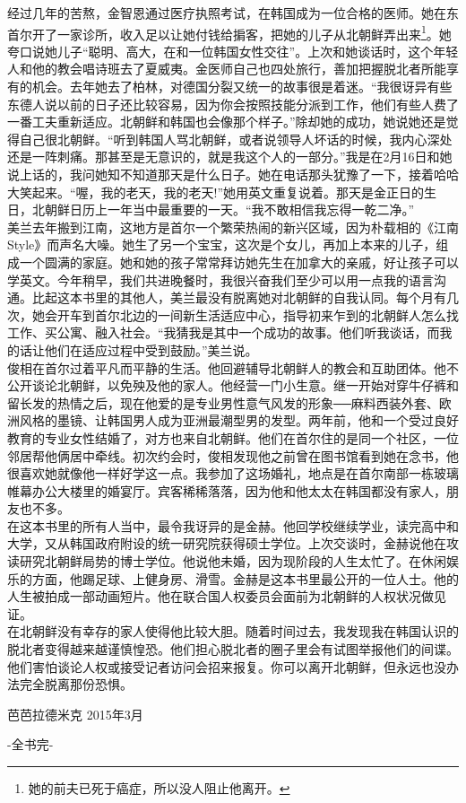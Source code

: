 经过几年的苦熬，金智恩通过医疗执照考试，在韩国成为一位合格的医师。她在东首尔开了一家诊所，收入足以让她付钱给掮客，把她的儿子从北朝鲜弄出来\footnote{她的前夫已死于癌症，所以没人阻止他离开。}。她夸口说她儿子“聪明、高大，在和一位韩国女性交往”。上次和她谈话时，这个年轻人和他的教会唱诗班去了夏威夷。金医师自己也四处旅行，善加把握脱北者所能享有的机会。去年她去了柏林，对德国分裂又统一的故事很是着迷。“我很讶异有些东德人说以前的日子还比较容易，因为你会按照技能分派到工作，他们有些人费了一番工夫重新适应。北朝鲜和韩国也会像那个样子。”除却她的成功，她说她还是觉得自己很北朝鲜。“听到韩国人骂北朝鲜，或者说领导人坏话的时候，我内心深处还是一阵刺痛。那甚至是无意识的，就是我这个人的一部分。”我是在2月16日和她说上话的，我问她知不知道那天是什么日子。她在电话那头犹豫了一下，接着哈哈大笑起来。“喔，我的老天，我的老天!”她用英文重复说着。那天是金正日的生日，北朝鲜日历上一年当中最重要的一天。“我不敢相信我忘得一乾二净。”\\

美兰去年搬到江南，这地方是首尔一个繁荣热闹的新兴区域，因为朴载相的《江南Style》而声名大噪。她生了另一个宝宝，这次是个女儿，再加上本来的儿子，组成一个圆满的家庭。她和她的孩子常常拜访她先生在加拿大的亲戚，好让孩子可以学英文。今年稍早，我们共进晚餐时，我很兴奋我们至少可以用一点我的语言沟通。比起这本书里的其他人，美兰最没有脱离她对北朝鲜的自我认同。每个月有几次，她会开车到首尔北边的一间新生活适应中心，指导初来乍到的北朝鲜人怎么找工作、买公寓、融入社会。“我猜我是其中一个成功的故事。他们听我谈话，而我的话让他们在适应过程中受到鼓励。”美兰说。\\

俊相在首尔过着平凡而平静的生活。他回避辅导北朝鲜人的教会和互助团体。他不公开谈论北朝鲜，以免殃及他的家人。他经营一门小生意。继一开始对穿牛仔裤和留长发的热情之后，现在他爱的是专业男性意气风发的形象──麻料西装外套、欧洲风格的墨镜、让韩国男人成为亚洲最潮型男的发型。两年前，他和一个受过良好教育的专业女性结婚了，对方也来自北朝鲜。他们在首尔住的是同一个社区，一位邻居帮他俩居中牵线。初次约会时，俊相发现他之前曾在图书馆看到她在念书，他很喜欢她就像他一样好学这一点。我参加了这场婚礼，地点是在首尔南部一栋玻璃帷幕办公大楼里的婚宴厅。宾客稀稀落落，因为他和他太太在韩国都没有家人，朋友也不多。\\

在这本书里的所有人当中，最令我讶异的是金赫。他回学校继续学业，读完高中和大学，又从韩国政府附设的统一研究院获得硕士学位。上次交谈时，金赫说他在攻读研究北朝鲜局势的博士学位。他说他未婚，因为现阶段的人生太忙了。在休闲娱乐的方面，他踢足球、上健身房、滑雪。金赫是这本书里最公开的一位人士。他的人生被拍成一部动画短片。他在联合国人权委员会面前为北朝鲜的人权状况做见证。\\

在北朝鲜没有幸存的家人使得他比较大胆。随着时间过去，我发现我在韩国认识的脱北者变得越来越谨慎惶恐。他们担心脱北者的圈子里会有试图举报他们的间谍。他们害怕谈论人权或接受记者访问会招来报复。你可以离开北朝鲜，但永远也没办法完全脱离那份恐惧。\\

\begin{flushright}
	芭芭拉德米克 2015年3月
\end{flushright}


\begin{center}
	-全书完-
\end{center}